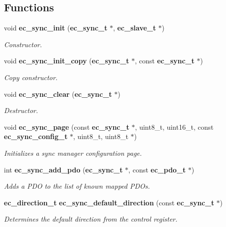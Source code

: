 \subsection*{\-Functions}
\begin{DoxyCompactItemize}
\item 
void {\bf ec\-\_\-sync\-\_\-init} ({\bf ec\-\_\-sync\-\_\-t} $\ast$, {\bf ec\-\_\-slave\-\_\-t} $\ast$)\label{sync_8h_a29f4dd145455097fef860bdd3c5a8de9}

\begin{DoxyCompactList}\small\item\em \-Constructor. \end{DoxyCompactList}\item 
void {\bf ec\-\_\-sync\-\_\-init\-\_\-copy} ({\bf ec\-\_\-sync\-\_\-t} $\ast$, const {\bf ec\-\_\-sync\-\_\-t} $\ast$)\label{sync_8h_a31f2b633260698acdce16b652d72809b}

\begin{DoxyCompactList}\small\item\em \-Copy constructor. \end{DoxyCompactList}\item 
void {\bf ec\-\_\-sync\-\_\-clear} ({\bf ec\-\_\-sync\-\_\-t} $\ast$)\label{sync_8h_af97d18e6309cc3ea675995287713f8f0}

\begin{DoxyCompactList}\small\item\em \-Destructor. \end{DoxyCompactList}\item 
void {\bf ec\-\_\-sync\-\_\-page} (const {\bf ec\-\_\-sync\-\_\-t} $\ast$, uint8\-\_\-t, uint16\-\_\-t, const {\bf ec\-\_\-sync\-\_\-config\-\_\-t} $\ast$, uint8\-\_\-t, uint8\-\_\-t $\ast$)
\begin{DoxyCompactList}\small\item\em \-Initializes a sync manager configuration page. \end{DoxyCompactList}\item 
int {\bf ec\-\_\-sync\-\_\-add\-\_\-pdo} ({\bf ec\-\_\-sync\-\_\-t} $\ast$, const {\bf ec\-\_\-pdo\-\_\-t} $\ast$)
\begin{DoxyCompactList}\small\item\em \-Adds a \-P\-D\-O to the list of known mapped \-P\-D\-Os. \end{DoxyCompactList}\item 
{\bf ec\-\_\-direction\-\_\-t} {\bf ec\-\_\-sync\-\_\-default\-\_\-direction} (const {\bf ec\-\_\-sync\-\_\-t} $\ast$)
\begin{DoxyCompactList}\small\item\em \-Determines the default direction from the control register. \end{DoxyCompactList}\end{DoxyCompactItemize}


